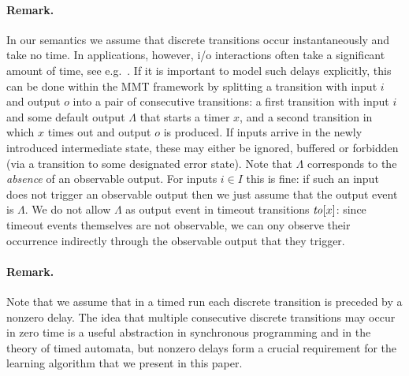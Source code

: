 \paragraph{Remark.}
In our semantics we assume that discrete transitions occur instantaneously and take no time. In applications, however, i/o interactions
often take a significant amount of time, see e.g.\  \cite{SHV16}. If it is important to model such delays
explicitly, this can be done within the MMT framework by splitting a transition with input $i$ and output $o$ into
a pair of consecutive transitions: a first transition with input $i$ and some default output $\Lambda$ that starts
a timer $x$, and a second transition in which $x$ times out and output $o$ is produced.
If inputs arrive in the newly introduced intermediate state, these may either be ignored, buffered or forbidden
(via a transition to some designated error state).
Note that $\Lambda$ corresponds to the \emph{absence} of an observable output. For inputs $i \in I$ this is fine: if such
an input does not trigger an observable output then we just assume that the output event is $\Lambda$. We do not allow
$\Lambda$ as output event in timeout transitions $\mathit{to}[x]$: since timeout events themselves are not observable, we can ony observe their occurrence indirectly through the observable output that they trigger.

\paragraph{Remark.}
Note that we assume that in a timed run each discrete transition is preceded by a nonzero delay.
The idea that multiple consecutive discrete transitions may occur in zero time is a useful abstraction in synchronous
programming and in the theory of timed automata, but nonzero delays form
a crucial requirement for the learning algorithm that we present in this paper.

